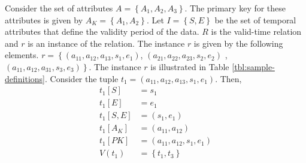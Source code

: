\begin{example}
Consider the set of attributes $A = \left \lbrace A_1, A_2, A_3 \right \rbrace$. The primary key for these attributes is given by $A_K = \left \lbrace A_1, A_2 \right \rbrace$. Let $I = \left \lbrace S, E \right \rbrace$ be the set of temporal attributes that define the validity period of the data. $R$ is the valid-time relation and $r$ is an instance of the relation. The instance $r$ is given by the following elements. $r = \left \lbrace \left(a_{11}, a_{12}, a_{13}, s_1 ,e_1 \right) \right.$,  $\left(a_{21}, a_{22}, a_{23}, s_2, e_2 \right)$ , $\left. \left(a_{11}, a_{12}, a_{31}, s_3, e_3 \right) \right \rbrace$. The instance $r$ is illustrated in Table \ref{tbl:sample-definitions}. 
Consider the tuple $t_1 = \left(a_{11}, a_{12}, a_{13}, s_1 ,e_1 \right)$. Then,
\begin{align}
 \nonumber
 t_1\left[S \right]&=s_1\\
 \nonumber
t_1[E]&=e_1\\
 \nonumber
t_1[S,E]&= \left(s_1, e_1\right)\\
 \nonumber
t_1\left[A_K\right] &= \left(a_{11}, a_{12} \right) \\
 \nonumber
t_1\left[PK\right] &=\left(a_{11}, a_{12}, s_1, e_1\right)\\
 \nonumber
V(t_1) &= \left \lbrace t_1, t_3 \right \rbrace
\end{align}



\end{example}





